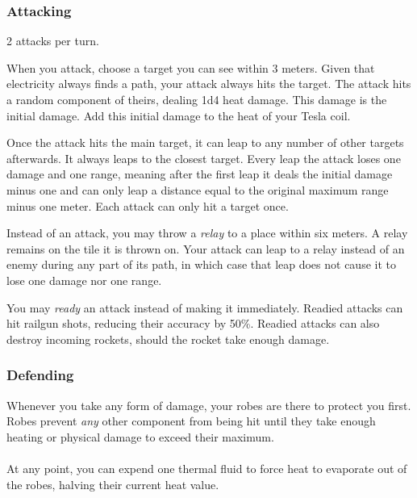 \documentclass[a4paper]{article}
\begin{document}
\subsubsection{Attacking} \label{arcmage_combat_attacking}

2 attacks per turn. 

When you attack, choose a target you can see within 3 meters. Given that electricity always finds a path, your attack always hits the target. The attack hits a random component of theirs, dealing 1d4 heat damage. This damage is the initial damage. Add this initial damage to the heat of your Tesla coil.

\hspace{0.5cm} Once the attack hits the main target, it can leap to any number of other targets afterwards. It always leaps to the closest target. Every leap the attack loses one damage and one range, meaning after the first leap it deals the initial damage minus one and can only leap a distance equal to the original maximum range minus one meter. Each attack can only hit a target once.

\hspace{0.5cm} Instead of an attack, you may throw a \textit{relay} to a place within six meters. A relay remains on the tile it is thrown on. Your attack can leap to a relay instead of an enemy during any part of its path, in which case that leap does not cause it to lose one damage nor one range. 

\hspace{0.5cm} You may \textit{ready} an attack instead of making it immediately. Readied attacks can hit railgun shots, reducing their accuracy by 50\%. Readied attacks can also destroy incoming rockets, should the rocket take enough damage.

\subsubsection{Defending}

Whenever you take any form of damage, your robes are there to protect you first. Robes prevent \textit{any} other component from being hit until they take enough heating or physical damage to exceed their maximum. 
\\ \\ 
At any point, you can expend one thermal fluid to force heat to evaporate out of the robes, halving their current heat value.


\newpage
\end{document}
